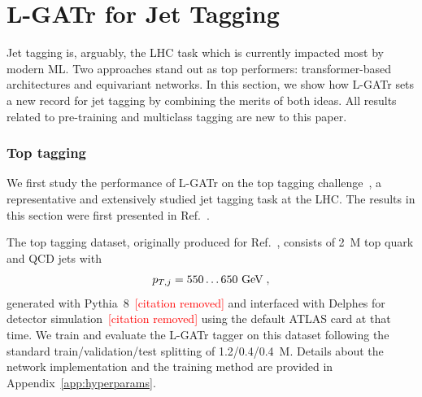 \documentclass[submission, Phys]{SciPost}
\begin{document}
\section{L-GATr for Jet Tagging}
\label{sec:tagging}

Jet tagging is, arguably, the LHC task which is currently impacted most by modern ML. Two approaches stand out as top performers: transformer-based architectures and equivariant networks. In this section, we show how L-GATr sets a new record for jet tagging by combining the merits of both ideas. All results related to pre-training and multiclass tagging are new to this paper.

\subsubsection*{Top tagging}


We first study the performance of L-GATr on the top tagging challenge~\cite{Kasieczka:2019dbj}, a representative and extensively studied jet tagging task at the LHC. The results in this section were first presented in Ref.~\cite{Spinner:2024hjm}.

The top tagging dataset, originally produced for Ref.~\cite{Heimel:2018mkt}, consists of 2~M top quark and QCD jets with 
%
\begin{align}
  p_{T,j} = 550 \ldots 650~\text{GeV} \; ,
\end{align}
%
generated with Pythia~8\textcolor{red}{~[citation removed]} and interfaced with Delphes for detector simulation\textcolor{red}{~[citation removed]} using the default ATLAS card at that time.
We train and evaluate the L-GATr tagger on this dataset following the standard train/validation/test splitting of 1.2/0.4/0.4~M. Details about the network implementation and the training method are provided in Appendix~\ref{app:hyperparams}. 
\end{document}
